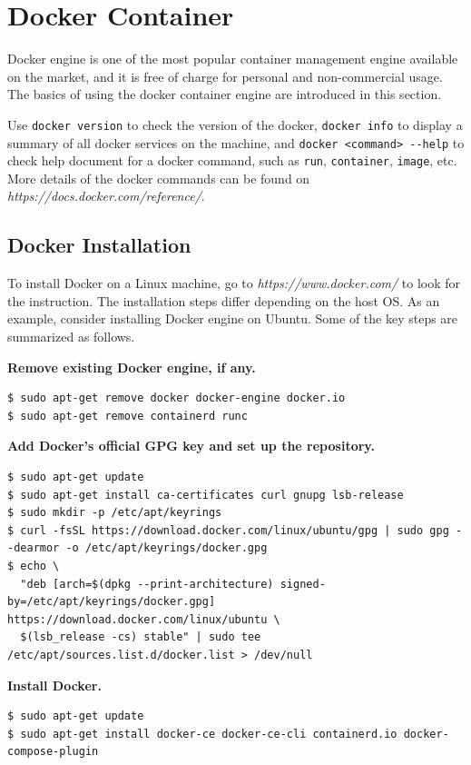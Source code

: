 \section{Docker Container} \label{ch:vac:sec:dc}

Docker engine is one of the most popular container management engine available on the market, and it is free of charge for personal and non-commercial usage. The basics of using the docker container engine are introduced in this section.

Use \verb|docker version| to check the version of the docker, \verb|docker info| to display a summary of all docker services on the machine, and \verb|docker <command> --help| to check help document for a docker command, such as \verb|run|, \verb|container|, \verb|image|, etc. More details of the docker commands can be found on \textit{https://docs.docker.com/reference/}.

\subsection{Docker Installation}

To install Docker on a Linux machine, go to \textit{https://www.docker.com/} to look for the instruction. The installation steps differ depending on the host OS. As an example, consider installing Docker engine on Ubuntu. Some of the key steps are summarized as follows.

\vspace{0.1in}
\noindent \textbf{Remove existing Docker engine, if any.}
\begin{lstlisting}
$ sudo apt-get remove docker docker-engine docker.io
$ sudo apt-get remove containerd runc
\end{lstlisting}

\vspace{0.1in}
\noindent \textbf{Add Docker's official GPG key and set up the repository.}
\begin{lstlisting}
$ sudo apt-get update
$ sudo apt-get install ca-certificates curl gnupg lsb-release
$ sudo mkdir -p /etc/apt/keyrings
$ curl -fsSL https://download.docker.com/linux/ubuntu/gpg | sudo gpg --dearmor -o /etc/apt/keyrings/docker.gpg
$ echo \
  "deb [arch=$(dpkg --print-architecture) signed-by=/etc/apt/keyrings/docker.gpg] https://download.docker.com/linux/ubuntu \
  $(lsb_release -cs) stable" | sudo tee /etc/apt/sources.list.d/docker.list > /dev/null
\end{lstlisting}

\vspace{0.1in}
\noindent \textbf{Install Docker.}
\begin{lstlisting}
$ sudo apt-get update
$ sudo apt-get install docker-ce docker-ce-cli containerd.io docker-compose-plugin
\end{lstlisting}

